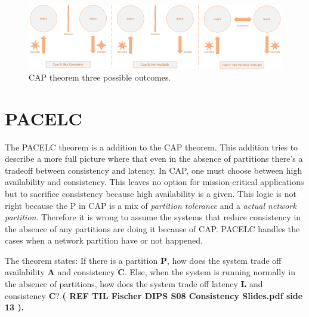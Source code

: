 \begin{figure}[h!]
	\centering
	\includegraphics[width=0.9\linewidth]{consistency/fig/cap_proof.png}
	\caption{CAP theorem three possible outcomes.}
	\label{fig:cap_proof}
\end{figure}


\section{PACELC}
The PACELC theorem is a addition to the CAP theorem. This addition tries to describe a more full picture where that even in the absence of partitions there's a tradeoff between consistency and latency. In CAP, one must choose between high availability and consistency. This leaves no option for mission-critical applications but to sacrifice consistency because high availability is a given. This logic is not right because the P in CAP is a mix of \textit{partition tolerance} and a \textit{actual network partition}. Therefore it is wrong to assume the systems that reduce consistency in the absence of any partitions are doing it because of CAP. PACELC handles the cases when a network partition have or not happened.

\noindent The theorem states: If there is a partition \textbf{P}, how does the system trade off availability \textbf{A} and consistency \textbf{C}. Else, when the system is running normally in
the absence of partitions, how does the system trade off latency \textbf{L}
and consistency \textbf{C}? \textbf{( REF TIL Fischer DIPS S08 Consistency Slides.pdf side 13 ).}

